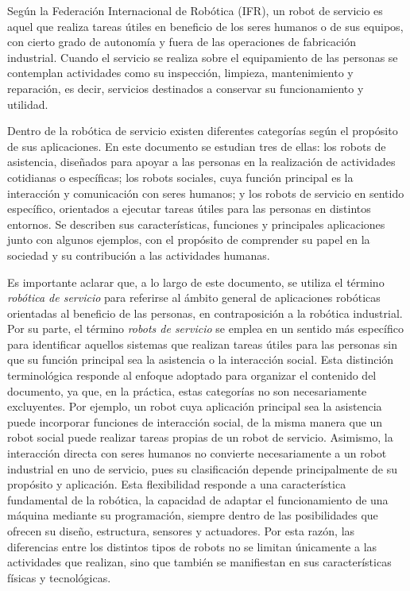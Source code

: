 \documentclass[11pt,a4paper]{article}
\begin{document}
Según la Federación Internacional de Robótica (IFR), un robot de servicio es aquel que realiza tareas útiles en beneficio de los seres humanos o de sus equipos, con cierto grado de autonomía y fuera de las operaciones de fabricación industrial. Cuando el servicio se realiza sobre el equipamiento de las personas se contemplan actividades como su inspección, limpieza, mantenimiento y reparación, es decir, servicios destinados a conservar su funcionamiento y utilidad.\cite{ifr}

Dentro de la robótica de servicio existen diferentes categorías según el propósito de sus aplicaciones. En este documento se estudian tres de ellas: los robots de asistencia, diseñados para apoyar a las personas en la realización de actividades cotidianas o específicas; los robots sociales, cuya función principal es la interacción y comunicación con seres humanos; y los robots de servicio en sentido específico, orientados a ejecutar tareas útiles para las personas en distintos entornos. Se describen sus características, funciones y principales aplicaciones junto con algunos ejemplos, con el propósito de comprender su papel en la sociedad y su contribución a las actividades humanas.

Es importante aclarar que, a lo largo de este documento, se utiliza el término \emph{robótica de servicio} para referirse al ámbito general de aplicaciones robóticas orientadas al beneficio de las personas, en contraposición a la robótica industrial. Por su parte, el término \emph{robots de servicio} se emplea en un sentido más específico para identificar aquellos sistemas que realizan tareas útiles para las personas sin que su función principal sea la asistencia o la interacción social. Esta distinción terminológica responde al enfoque adoptado para organizar el contenido del documento, ya que, en la práctica, estas categorías no son necesariamente excluyentes. Por ejemplo, un robot cuya aplicación principal sea la asistencia puede incorporar funciones de interacción social, de la misma manera que un robot social puede realizar tareas propias de un robot de servicio. Asimismo, la interacción directa con seres humanos no convierte necesariamente a un robot industrial en uno de servicio, pues su clasificación depende principalmente de su propósito y aplicación. Esta flexibilidad responde a una característica fundamental de la robótica, la capacidad de adaptar el funcionamiento de una máquina mediante su programación, siempre dentro de las posibilidades que ofrecen su diseño, estructura, sensores y actuadores. Por esta razón, las diferencias entre los distintos tipos de robots no se limitan únicamente a las actividades que realizan, sino que también se manifiestan en sus características físicas y tecnológicas.
\end{document}
